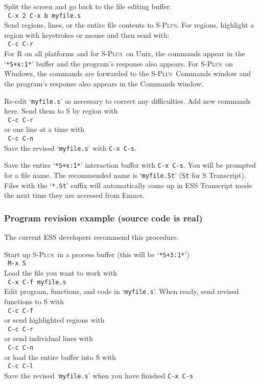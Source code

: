 \documentclass{article}
\newcommand*{\Splus}{\textsc{S-Plus}}
\newcommand{\stexttt}[1]{{\small\texttt{#1}}}
\newcommand{\elcode}[1]{\\{\stexttt{\hspace*{2em} #1}}\\}
\newcommand{\file}[1]{`\stexttt{#1}'}
\begin{document}
Split the screen and go back to the file editing buffer.
  \elcode{C-x 2 C-x b myfile.s}
Send regions, lines, or the entire file contents to \Splus.
For regions, highlight a region with keystrokes or mouse
and then send with:
  \elcode{C-c C-r}
For R on all platforms and for \Splus\ on Unix, the commands appear in
the \file{*S+x:1*} buffer and the program's response also appears.
For \Splus\ on Windows, the commands are forwarded to the \Splus\ Commands
window and the program's response also appears in the Commands window.

Re-edit \file{myfile.s} as necessary to correct any difficulties.  Add
new commands here.  Send them to S by region with
  \elcode{C-c C-r}
or one line at a time with
  \elcode{C-c C-n}
Save the revised \file{myfile.s} with \stexttt{C-x C-s}.

Save the entire \file{*S+x:1*} interaction buffer with \stexttt{C-x C-s}.
You will be prompted for a file name.  The recommended name is
\file{myfile.St} (\stexttt{St} for S Transcript).
Files with the \file{*.St} suffix will automatically come up in ESS
Transcript mode the next time they are accessed from Emacs.


\subsubsection{Program revision example (source code is real)}
The current ESS developers recommend this procedure.

\noindent
Start up \Splus\ in a process buffer (this will be \file{*S+3:1*})
  \elcode{M-x S}
Load the file you want to work with
  \elcode{C-x C-f myfile.s}
Edit program, functions, and code in \file{myfile.s}.
When ready, send revised functions to S with
  \elcode{C-c C-f}
or send highlighted regions with
  \elcode{C-c C-r}
or send individual lines with
  \elcode{C-c C-n}
or load the entire buffer into S with
  \elcode{C-c C-l}
Save the revised \file{myfile.s} when you have finished
  \stexttt{C-x C-s}


\end{document}
